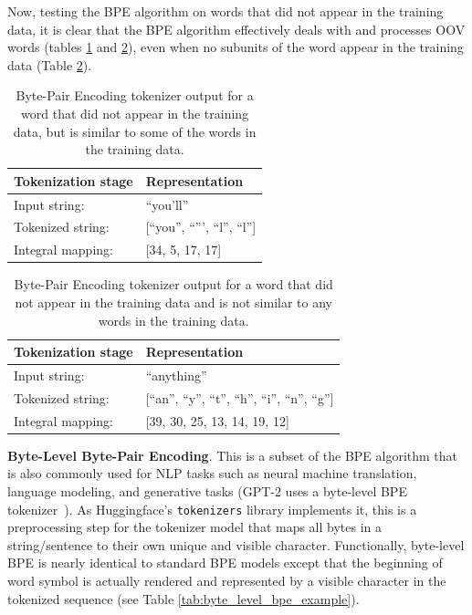 \documentclass[12pt]{article}
\begin{document}
Now, testing the BPE algorithm on words that did not appear in the training data, it is clear that the BPE algorithm effectively deals with and
processes OOV words (tables \ref{tab:bpe_unk_similar} and \ref{tab:bpe_unk}), even when no subunits of the word appear in the training data (Table
\ref{tab:bpe_unk}).

\begin{table}[!t]
    \centering
    \begin{tabular}{l l}
        \toprule
        Tokenization stage & Representation                 \\
        \midrule
        Input string:      & ``you'll''                     \\
        Tokenized string:  & [``you'', ``''', ``l'', ``l''] \\
        Integral mapping:  & [34, 5, 17, 17]                \\
        \bottomrule
    \end{tabular}
    \caption{Byte-Pair Encoding tokenizer output for a word that did not appear in the training data, but is similar to some of the words in the
        training data.}
    \label{tab:bpe_unk_similar}
\end{table}

\begin{table}[!t]
    \centering
    \begin{tabular}{l l}
        \toprule
        Tokenization stage & Representation                                     \\
        \midrule
        Input string:      & ``anything''                                       \\
        Tokenized string:  & [``an'', ``y'', ``t'', ``h'', ``i'', ``n'', ``g''] \\
        Integral mapping:  & [39, 30, 25, 13, 14, 19, 12]                       \\
        \bottomrule
    \end{tabular}
    \caption{Byte-Pair Encoding tokenizer output for a word that did not appear in the training data and is not similar to any words in the training
        data.}
    \label{tab:bpe_unk}
\end{table}

\textbf{Byte-Level Byte-Pair Encoding}. This is a subset of the BPE algorithm that is also commonly used for NLP tasks such as neural machine
translation, language modeling, and generative tasks (GPT-2 uses a byte-level BPE tokenizer~\cite{radford_language_2019}). As Huggingface's
\lstinline|tokenizers| library implements it, this is a preprocessing step for the tokenizer model that maps all bytes in a string/sentence to their
own unique and visible character. Functionally, byte-level BPE is nearly identical to standard BPE models except that the beginning of word symbol is
actually rendered and represented by a visible character in the tokenized sequence (see Table \ref{tab:byte_level_bpe_example}).
\end{document}
